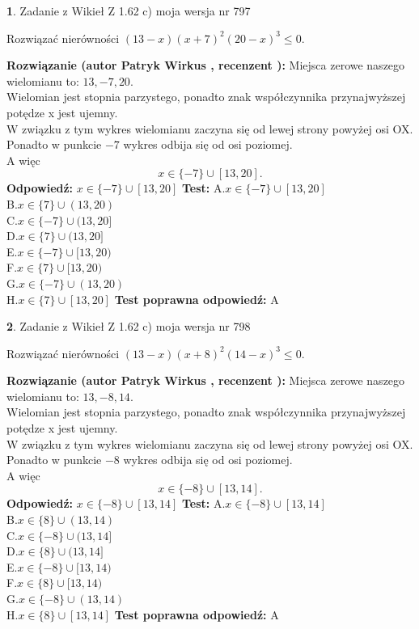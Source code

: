 \documentclass[12pt, a4paper]{article}
\theoremstyle{definition} %
\newtheorem{zad}{}
\newcommand{\zadStart}[1]{\begin{zad}#1\newline}
\newcommand{\zadStop}{\end{zad}}
\newcommand{\rozwStart}[2]{\noindent \textbf{Rozwiązanie (autor #1 , recenzent #2): }\newline}
\newcommand{\rozwStop}{\newline}
\newcommand{\odpStart}{\noindent \textbf{Odpowiedź:}\newline}
\newcommand{\odpStop}{\newline}
\newcommand{\testStart}{\noindent \textbf{Test:}\newline}
\newcommand{\testStop}{\newline}
\newcommand{\kluczStart}{\noindent \textbf{Test poprawna odpowiedź:}\newline}
\newcommand{\kluczStop}{\newline}
\begin{document}
\zadStart{Zadanie z Wikieł Z 1.62 c) moja wersja nr 797}

Rozwiązać nierówności $(13-x)(x+7)^{2}(20-x)^{3}\le0$.
\zadStop
\rozwStart{Patryk Wirkus}{}
Miejsca zerowe naszego wielomianu to: $13, -7, 20$.\\
Wielomian jest stopnia parzystego, ponadto znak współczynnika przy\linebreak najwyższej potędze x jest ujemny.\\ W związku z tym wykres wielomianu zaczyna się od lewej strony powyżej osi OX.\\
Ponadto w punkcie $-7$ wykres odbija się od osi poziomej.\\
A więc $$x \in \{-7\} \cup [13,20].$$
\rozwStop
\odpStart
$x \in \{-7\} \cup [13,20]$
\odpStop
\testStart
A.$x \in \{-7\} \cup [13,20]$\\
B.$x \in \{7\} \cup (13,20)$\\
C.$x \in \{-7\} \cup (13,20]$\\
D.$x \in \{7\} \cup (13,20]$\\
E.$x \in \{-7\} \cup [13,20)$\\
F.$x \in \{7\} \cup [13,20)$\\
G.$x \in \{-7\} \cup (13,20)$\\
H.$x \in \{7\} \cup [13,20]$
\testStop
\kluczStart
A
\kluczStop



\zadStart{Zadanie z Wikieł Z 1.62 c) moja wersja nr 798}

Rozwiązać nierówności $(13-x)(x+8)^{2}(14-x)^{3}\le0$.
\zadStop
\rozwStart{Patryk Wirkus}{}
Miejsca zerowe naszego wielomianu to: $13, -8, 14$.\\
Wielomian jest stopnia parzystego, ponadto znak współczynnika przy\linebreak najwyższej potędze x jest ujemny.\\ W związku z tym wykres wielomianu zaczyna się od lewej strony powyżej osi OX.\\
Ponadto w punkcie $-8$ wykres odbija się od osi poziomej.\\
A więc $$x \in \{-8\} \cup [13,14].$$
\rozwStop
\odpStart
$x \in \{-8\} \cup [13,14]$
\odpStop
\testStart
A.$x \in \{-8\} \cup [13,14]$\\
B.$x \in \{8\} \cup (13,14)$\\
C.$x \in \{-8\} \cup (13,14]$\\
D.$x \in \{8\} \cup (13,14]$\\
E.$x \in \{-8\} \cup [13,14)$\\
F.$x \in \{8\} \cup [13,14)$\\
G.$x \in \{-8\} \cup (13,14)$\\
H.$x \in \{8\} \cup [13,14]$
\testStop
\kluczStart
A
\kluczStop
\end{document}
